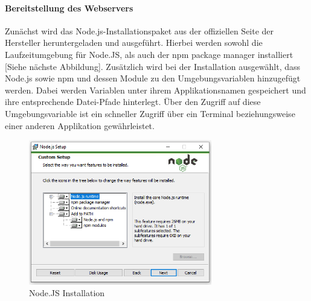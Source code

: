 \paragraph{Bereitstellung des Webservers}
Zunächst wird das Node.js-Installationspaket aus der offiziellen Seite der Hersteller heruntergeladen und ausgeführt. Hierbei werden sowohl die Laufzeitumgebung für Node.JS, als auch der npm package manager installiert [Siehe nächste Abbildung]. 
Zusätzlich wird bei der Installation ausgewählt, dass Node.js sowie npm und dessen Module zu den Umgebungsvariablen hinzugefügt werden. Dabei werden Variablen unter ihrem Applikationsnamen gespeichert und ihre entsprechende Datei-Pfade hinterlegt.
Über den Zugriff auf diese Umgebungsvariable ist ein schneller Zugriff über ein Terminal beziehungsweise einer anderen Applikation gewährleistet.


\begin{figure}[h]
\centering
\includegraphics[width=8cm]{images/nodejs_install.png}
\caption{Node.JS Installation}
\end{figure}

